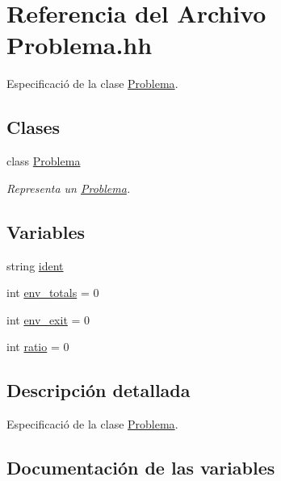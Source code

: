 \hypertarget{_problema_8hh}{}\section{Referencia del Archivo Problema.\+hh}
\label{_problema_8hh}


Especificació de la clase \mbox{\hyperlink{class_problema}{Problema}}.  


\subsection*{Clases}
\begin{DoxyCompactItemize}
\item 
class \mbox{\hyperlink{class_problema}{Problema}}
\begin{DoxyCompactList}\small\item\em Representa un \mbox{\hyperlink{class_problema}{Problema}}. \end{DoxyCompactList}\end{DoxyCompactItemize}
\subsection*{Variables}
\begin{DoxyCompactItemize}
\item 
string \mbox{\hyperlink{_problema_8hh_ac8e708e2cf89b2a2ebf3794f26dc6095}{ident}}
\item 
int \mbox{\hyperlink{_problema_8hh_a73b5d92e248a4b095421d63395b1462d}{env\+\_\+totals}} = 0
\item 
int \mbox{\hyperlink{_problema_8hh_a3951342fc1aa6b676dd35ecce4239f88}{env\+\_\+exit}} = 0
\item 
int \mbox{\hyperlink{_problema_8hh_a79e45999bba256f0615955bc9b13f414}{ratio}} = 0
\end{DoxyCompactItemize}


\subsection{Descripción detallada}
Especificació de la clase \mbox{\hyperlink{class_problema}{Problema}}. 



\subsection{Documentación de las variables}
\mbox{\label{_problema_8hh_ac8e708e2cf89b2a2ebf3794f26dc6095}} 
